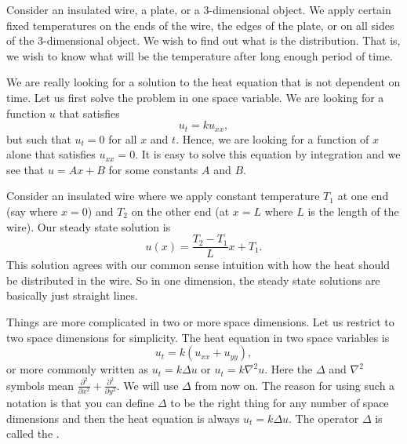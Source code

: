 
Consider an insulated wire, a plate, or a 3-dimensional object.
We apply
certain fixed temperatures on the ends of the wire, the edges of the plate,
or on all sides of the 3-dimensional object.  We wish to find out what is the
\emph{} distribution.  That is, we wish to know what will
be the temperature after long enough period of time.

We are really looking for a solution to the heat equation that is not
dependent on time.  Let us first solve the problem in one space variable.  We are
looking for a function $u$ that satisfies
\begin{equation*}
u_t = k u_{xx} ,
\end{equation*}
but such that $u_t = 0$ for all $x$ and $t$.  Hence, we are looking for a
function of $x$ alone that satisfies $u_{xx} = 0$.  It is easy to solve this
equation by integration and we see that $u = Ax+B$ for some constants $A$ and
$B$.

Consider an insulated wire where we apply constant temperature $T_1$
at one end (say where $x=0$) and $T_2$ on the other end (at $x=L$ where $L$
is the length of the wire).  Our steady state solution is
\begin{equation*}
u(x) = \frac{T_2-T_1}{L} x + T_1 .
\end{equation*}
This solution agrees with our common sense intuition with how the heat should be
distributed in the wire.  So in one dimension, the steady state solutions
are basically just straight lines.

Things are more complicated in two or more space dimensions.  Let us
restrict to two space dimensions for simplicity.  The heat equation in two
space variables is
\begin{equation} \label{dirich:heateq}
u_t = k(u_{xx} + u_{yy}) ,
\end{equation}
or more commonly written as
$u_t = k \Delta u$ or
$u_t = k \nabla^2 u$.  Here the $\Delta$ and $\nabla^2$ symbols
mean $\frac{\partial^2}{\partial x^2} +
\frac{\partial^2}{\partial y^2}$.  We will use $\Delta$
from now on.  The reason for using such a notation is that you
can define $\Delta$ to be the right thing for any number of space
dimensions and then the heat equation is always
$u_t = k \Delta u$.  The operator $\Delta$ is called the \emph{}.

